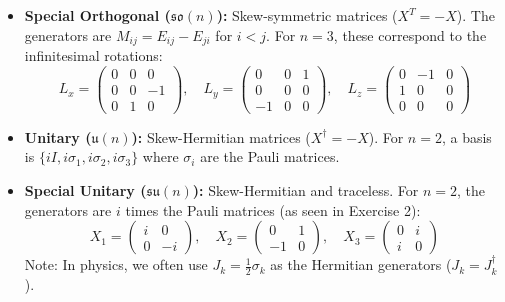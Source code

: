 \begin{solution}
\begin{itemize}
    \[ H = \begin{pmatrix} 1 & 0 \\ 0 & -1 \end{pmatrix}, \quad E = \begin{pmatrix} 0 & 1 \\ 0 & 0 \end{pmatrix}, \quad F = \begin{pmatrix} 0 & 0 \\ 1 & 0 \end{pmatrix} \]
    \item \textbf{Special Orthogonal ($\mathfrak{so}(n)$):} Skew-symmetric matrices ($X^T = -X$). The generators are $M_{ij} = E_{ij} - E_{ji}$ for $i < j$. For $n=3$, these correspond to the infinitesimal rotations:
    \[ L_x = \begin{pmatrix} 0 & 0 & 0 \\ 0 & 0 & -1 \\ 0 & 1 & 0 \end{pmatrix}, \quad L_y = \begin{pmatrix} 0 & 0 & 1 \\ 0 & 0 & 0 \\ -1 & 0 & 0 \end{pmatrix}, \quad L_z = \begin{pmatrix} 0 & -1 & 0 \\ 1 & 0 & 0 \\ 0 & 0 & 0 \end{pmatrix} \]
    \item \textbf{Unitary ($\mathfrak{u}(n)$):} Skew-Hermitian matrices ($X^\dagger = -X$). For $n=2$, a basis is $\{iI, i\sigma_1, i\sigma_2, i\sigma_3\}$ where $\sigma_i$ are the Pauli matrices.
    \item \textbf{Special Unitary ($\mathfrak{su}(n)$):} Skew-Hermitian and traceless. For $n=2$, the generators are $i$ times the Pauli matrices (as seen in Exercise 2):
    \[ X_1 = \begin{pmatrix} i & 0 \\ 0 & -i \end{pmatrix}, \quad X_2 = \begin{pmatrix} 0 & 1 \\ -1 & 0 \end{pmatrix}, \quad X_3 = \begin{pmatrix} 0 & i \\ i & 0 \end{pmatrix} \]
    Note: In physics, we often use $J_k = \frac{1}{2} \sigma_k$ as the Hermitian generators ($J_k = J_k^\dagger$).
\end{itemize}
\end{solution}

